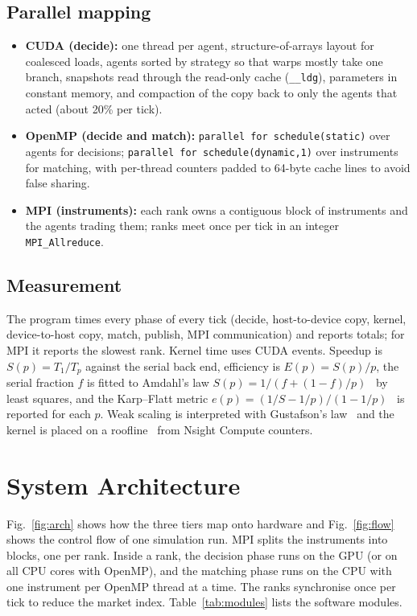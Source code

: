 \subsection{Parallel mapping}
\begin{itemize}
\item \textbf{CUDA (decide):} one thread per agent, structure-of-arrays layout for coalesced loads,
  agents sorted by strategy so that warps mostly take one branch, snapshots read through the
  read-only cache (\texttt{\_\_ldg}), parameters in constant memory, and compaction of the copy
  back to only the agents that acted (about 20\% per tick).
\item \textbf{OpenMP (decide and match):} \texttt{parallel for schedule(static)} over agents for decisions;
  \texttt{parallel for schedule(dynamic,1)} over instruments for matching, with per-thread counters
  padded to 64-byte cache lines to avoid false sharing.
\item \textbf{MPI (instruments):} each rank owns a contiguous block of instruments and the agents
  trading them; ranks meet once per tick in an integer \texttt{MPI\_Allreduce}.
\end{itemize}

\subsection{Measurement}
The program times every phase of every tick (decide, host-to-device copy, kernel, device-to-host
copy, match, publish, MPI communication) and reports totals; for MPI it reports the slowest rank.
Kernel time uses CUDA events. Speedup is $S(p)=T_1/T_p$ against the serial back end, efficiency
is $E(p)=S(p)/p$, the serial fraction $f$ is fitted to Amdahl's law
$S(p)=1/(f+(1-f)/p)$~\cite{amdahl1967} by least squares, and the Karp--Flatt metric
$e(p)=(1/S-1/p)/(1-1/p)$~\cite{karp1990} is reported for each $p$. Weak scaling is interpreted
with Gustafson's law~\cite{gustafson1988} and the kernel is placed on a roofline~\cite{williams2009}
from Nsight Compute counters.

\section{System Architecture}\label{sec:arch}
Fig.~\ref{fig:arch} shows how the three tiers map onto hardware and Fig.~\ref{fig:flow} shows the
control flow of one simulation run. MPI splits the instruments into blocks, one per rank. Inside a
rank, the decision phase runs on the GPU (or on all CPU cores with OpenMP), and the matching phase
runs on the CPU with one instrument per OpenMP thread at a time. The ranks synchronise once per
tick to reduce the market index. Table~\ref{tab:modules} lists the software modules.

